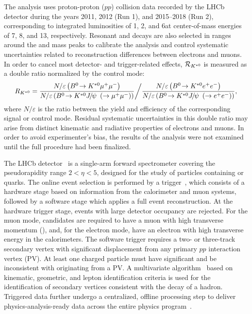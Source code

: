 The analysis uses proton-proton ($pp$) collision data recorded by the LHCb detector during the years 2011, 2012 (Run 1), and 2015--2018 (Run 2), corresponding to integrated luminosities of 1, 2, and
6\invfb at center-of-mass energies of 7, 8, and 13\tev, respectively.  Resonant \decay{\Bz}{\Kstarz \jpsi~(\to \ell^+ \ell^-)} and \decay{\Bz}{\Kstarz \psitwos~(\to \ell^+ \ell^-)} decays are also selected in \qsq ranges around the \jpsi and \psitwos mass peaks to calibrate the analysis and control systematic uncertainties related to reconstruction differences between electrons and muons. In order to cancel most detector- and trigger-related effects, ${\cal{R}}_{{{K}^{*0}}}$ is measured as a double ratio normalized by the \decay{\Bz}{\Kstarz \jpsi~(\to \ell^+ \ell^-)} control mode:
\begin{equation}
  R_{\Kstarz} = {\frac{N/\varepsilon\left(\decay{\Bz}{\Kstarz\mu^+\mu^-}\right)}{N/\varepsilon\left(\decay{\Bz}{\Kstarz\jpsi~\left(\to \mu^+\mu^-
\right)}\right)}}\bigg/{\frac{N/\varepsilon\left(\decay{\Bz}{\Kstarz e^+e^-}\right)}{N/\varepsilon\left(\decay{\Bz}{\Kstarz\jpsi~\left(\to e^+e^- \right)}\right)}},
\label{eq:RKst}
\end{equation}
where $N/\varepsilon$ is the ratio between the yield and efficiency of the corresponding signal or control mode. Residual systematic uncertainties in this double ratio may arise from distinct kinematic and radiative properties of electrons and muons.  In order to avoid experimenter’s bias, the
results of the analysis were not examined until the full procedure had been finalized.

The LHCb detector~\cite{LHCb-DP-2008-001, LHCb-DP-2014-002} is a single-arm forward spectrometer covering the pseudorapidity range $2 < \eta < 5$, designed for
the study of particles containing \bquark or \cquark quarks.
The online event selection is performed by a trigger~\cite{LHCb-DP-2012-004}, which consists of a hardware stage based on
information from the calorimeter and muon systems, followed by a software stage which applies a full event reconstruction. At the hardware trigger stage, events
with large detector occupancy are rejected. For the muon mode, candidates are required to have a muon with high transverse momentum (\pt), and, for the electron mode, have an electron with high transverse energy in the calorimeters. The software trigger requires a two- or
three-track secondary vertex with significant displacement from any primary $pp$ interaction vertex (PV). At least one charged particle must have significant \pt and
be inconsistent with originating from a PV. A multivariate algorithm~\cite{BBDT, LHCb-PROC-2015-018} based on kinematic, geometric, and lepton
identification criteria is used for the identification of secondary vertices consistent with the decay of a \bquark hadron.
Triggered data further undergo a centralized, offline processing step
to deliver physics-analysis-ready data across the entire \lhcb physics program~\cite{Stripping}.

